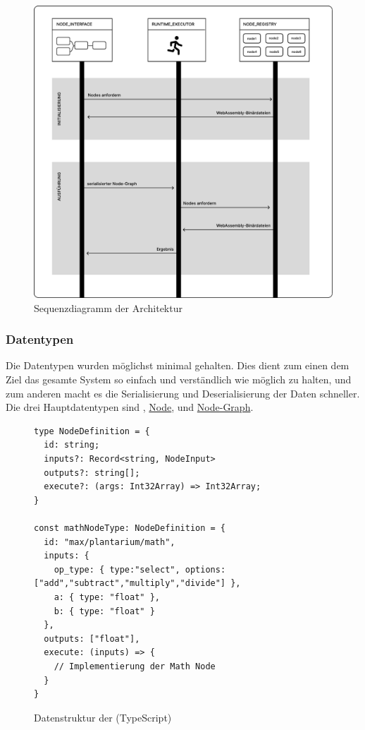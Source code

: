 \documentclass[ngerman]{article}
\begin{document}
\begin{figure}[hbtp]
    \centering
    \includegraphics[width=1\textwidth]{graphics/OVERVIEW_SEQUENCE.pdf}
    \caption{Sequenzdiagramm der Architektur}
    \label{fig:overview_sequence}
\end{figure}

\pagebreak

\subsubsection{Datentypen}

Die Datentypen wurden möglichst minimal gehalten. Dies dient zum einen dem Ziel das gesamte System so einfach und verständlich wie möglich zu halten, und zum
anderen macht es die Serialisierung und Deserialisierung der Daten schneller.
\br
Die drei Hauptdatentypen sind  , \hyperref[fig:data_node]{Node},  und \hyperref[fig:data_node_graph]{Node-Graph}. 


\begin{figure}[htbp]
  \begin{code}
    \begin{verbatim}
type NodeDefinition = {
  id: string;
  inputs?: Record<string, NodeInput>
  outputs?: string[];
  execute?: (args: Int32Array) => Int32Array;
}

const mathNodeType: NodeDefinition = {
  id: "max/plantarium/math",
  inputs: { 
    op_type: { type:"select", options: ["add","subtract","multiply","divide"] }, 
    a: { type: "float" }, 
    b: { type: "float" } 
  },
  outputs: ["float"],
  execute: (inputs) => {
    // Implementierung der Math Node
  }
}
    \end{verbatim}
  \end{code}

  \caption{Datenstruktur der  (TypeScript)}
  \label{sec:data_node_type}

\end{figure}
\end{document}
